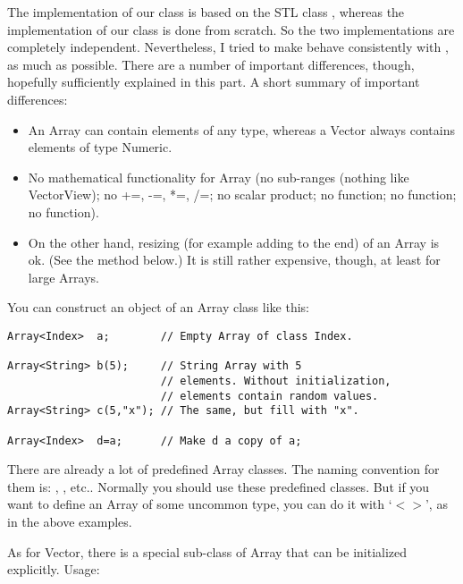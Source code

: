The implementation of our  class is based on the STL class
, whereas the implementation of our 
class is done from scratch. So the two implementations are completely
independent. Nevertheless, I tried to make  behave
consistently with , as much as possible. There are a number
of important differences, though, hopefully sufficiently explained in
this part. A short summary of important differences:

\begin{itemize}
\item An Array can contain elements of any type, whereas a Vector
  always contains elements of type Numeric.
\item No mathematical functionality for Array (no sub-ranges (nothing
  like VectorView); no +=, -=, *=, /=; no scalar product; no
   function; no  function; no
   function).
\item On the other hand, resizing (for example adding to the end) of
  an Array is ok. (See the  method below.) It is still
  rather expensive, though, at least for large Arrays. 
\end{itemize}

You can construct an object of an Array class like this:

\begin{verbatim}
Array<Index>  a;        // Empty Array of class Index.

Array<String> b(5);     // String Array with 5
                        // elements. Without initialization, 
                        // elements contain random values.
Array<String> c(5,"x"); // The same, but fill with "x".

Array<Index>  d=a;      // Make d a copy of a;
\end{verbatim}

There are already a lot of predefined Array classes. The naming
convention for them is: , ,
etc.. Normally you should use these predefined classes. But if you want
to define an Array of some uncommon type, you can do it with `$<>$',
as in the above examples.

As for Vector, there is a special sub-class of Array that can be
initialized explicitly. Usage:

